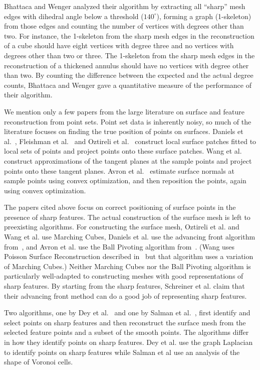 Bhattaca and Wenger analyzed their algorithm by extracting all 
``sharp'' mesh edges with dihedral angle below a threshold ($140^\circ$),
forming a graph (1-skeleton) from those edges
and counting the number of vertices with degrees other than two.
For instance, the 1-skeleton from the sharp mesh edges in the reconstruction
of a cube should have eight vertices with degree three
and no vertices with degrees other than two or three.
The 1-skeleton from the sharp mesh edges in the reconstruction
of a thickened annulus should have no vertices with degree other than two.
By counting the difference between the expected and the actual degree counts,
Bhattaca and Wenger gave a quantitative measure of the performance
of their algorithm.

We mention only a few papers from the large literature
on surface and feature reconstruction from point sets.
Point set data is inherently noisy, so much of the literature
focuses on finding the true position of points on surfaces.
Daniels et al.~\cite{Daniels:2007:Robust},
Fleishman et al.~\cite{fcs-rmlsf-2005}
and Oztireli et al.~\cite{Oztireli2009}
construct local surface patches fitted to local sets of points
and project points onto these surface patches.
Wang et al.~\cite{Wang:2013:Feature}
construct approximations of the tangent planes at the sample points
and project points onto these tangent planes.
Avron et al.~\cite{avron2010L} estimate surface normals
at sample points using convex optimization,
and then reposition the points, again using convex optimization.

The papers cited above focus on correct positioning of surface points
in the presence of sharp features.
The actual construction of the surface mesh is
left to preexisting algorithms.
For constructing the surface mesh,
Oztireli et al. and Wang et al. use Marching Cubes,
Daniels et al. use the advancing front algorithm 
from~\cite{Schreiner:2006:Direct},
and Avron et al. use the Ball Pivoting algorithm 
from~\cite{Bernardini:1999:Ball}.
(Wang uses Poisson Surface Reconstruction described 
in~\cite{Kazhdan:2006:Poisson} but that algorithm
uses a variation of Marching Cubes.)
Neither Marching Cubes nor the Ball Pivoting algorithm
is particularly well-adapted to constructing meshes 
with good representations of sharp features.
By starting from the sharp features,
Schreiner et al. claim that their advancing front method
can do a good job of representing sharp features.

Two algorithms, one by Dey et al.~\cite{Dey2012} and 
one by Salman et al.~\cite{sym-fpmg-10},
first identify and select points on sharp features
and then reconstruct the surface mesh from the selected feature points
and a subset of the smooth points.
The algorithms differ in how they identify points on sharp features.
Dey et al. use the graph Laplacian to identify points on sharp features
while Salman et al use an analysis of the shape of Voronoi cells.

